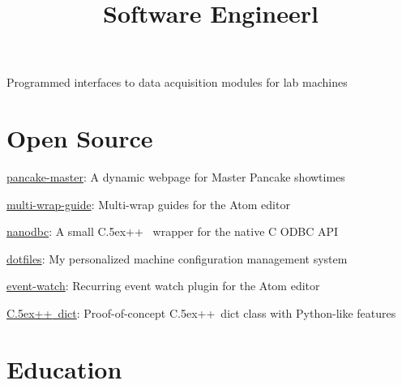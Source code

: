 \documentclass[12pt, tweaklist, line]{res}
\let\tempone\itemize
\let\temptwo\enditemize
\renewenvironment{itemize}{\tempone\vspace{-.15in}\setlength{\topsep}{0pt}\setlength{\itemsep}{3pt}\vspace{-.15in}}{\temptwo}
\def\Cplusplus{{\rm C\raise.5ex\hbox{\small ++}}}
\begin{document}
\begin{resume}
\title{Software Engineer}
\begin{position}
\begin{itemize}
\item Programmed interfaces to data acquisition modules for lab machines
\end{itemize}
\end{position}

\pagebreak

\section{Open Source}
\begin{itemize}
\vspace{.55in} %
\item \href{http://pancake.lexicalunit.com}{pancake-master}: A dynamic webpage for Master Pancake showtimes
\item \href{https://atom.io/packages/multi-wrap-guide}{multi-wrap-guide}: Multi-wrap guides for the Atom editor%
\item \href{http://nanodbc.lexicalunit.com}{nanodbc}: A small \Cplusplus~ wrapper for the native C ODBC API
\item \href{https://github.com/lexicalunit/dotfiles}{dotfiles}: My personalized machine configuration management system
\item \href{https://atom.io/packages/event-watch}{event-watch}: Recurring event watch plugin for the Atom editor
\item \href{https://github.com/lexicalunit/dict}{\Cplusplus~dict}: Proof-of-concept \Cplusplus~dict class with Python-like features
\end{itemize}

\section{Education}
\begin{format}
  \\
  \title{l}\\
  \body\\
\end{format}


\end{resume}
\end{document}
